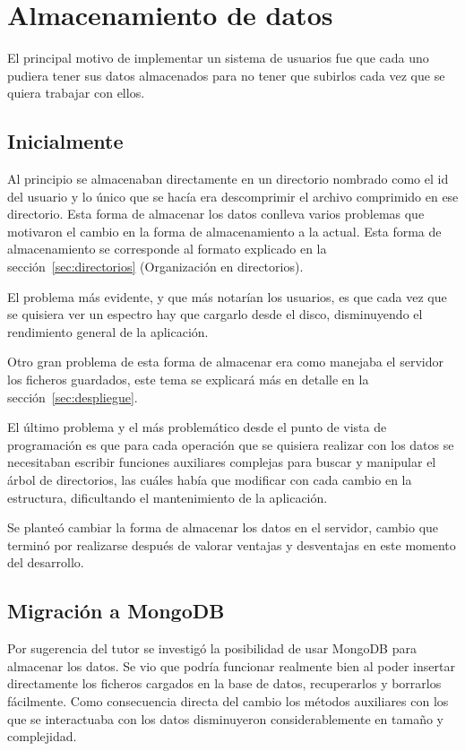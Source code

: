 
\section{Almacenamiento de datos}

El principal motivo de implementar un sistema de usuarios fue que cada uno
pudiera tener sus datos almacenados para no tener que subirlos cada vez que se
quiera trabajar con ellos.

\subsection{Inicialmente}

Al principio se almacenaban directamente en un directorio nombrado como el id
del usuario y lo único que se hacía era descomprimir el archivo comprimido en
ese directorio. Esta forma de almacenar los datos conlleva varios problemas que
motivaron el cambio en la forma de almacenamiento a la actual. Esta forma de
almacenamiento se corresponde al formato explicado en la
sección~\ref{sec:directorios} (Organización en directorios).

El problema más evidente, y que más notarían los usuarios, es que cada vez que
se quisiera ver un espectro hay que cargarlo desde el disco, disminuyendo el
rendimiento general de la aplicación.

Otro gran problema de esta forma de almacenar era como manejaba el servidor los
ficheros guardados, este tema se explicará más en detalle en la
sección~\ref{sec:despliegue}.

El último problema y el más problemático desde el punto de vista de programación
es que para cada operación que se quisiera realizar con los datos se necesitaban
escribir funciones auxiliares complejas para buscar y manipular el árbol de
directorios, las cuáles había que modificar con cada cambio en la estructura,
dificultando el mantenimiento de la aplicación.

Se planteó cambiar la forma de almacenar los datos en el servidor, cambio que
terminó por realizarse después de valorar ventajas y desventajas en este momento
del desarrollo.

\subsection{Migración a MongoDB}

Por sugerencia del tutor se investigó la posibilidad de usar MongoDB para
almacenar los datos. Se vio que podría funcionar realmente bien al poder
insertar directamente los ficheros cargados en la base de datos, recuperarlos y
borrarlos fácilmente. Como consecuencia directa del cambio los métodos
auxiliares con los que se interactuaba con los datos disminuyeron
considerablemente en tamaño y complejidad.


